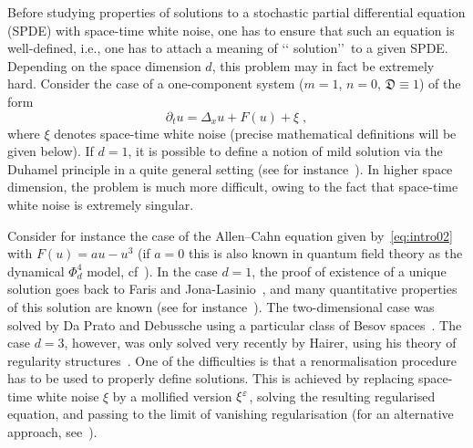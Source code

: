 \documentclass[reqno,11pt]{article}
\begin{document}
Before studying properties of solutions to a stochastic partial differential
equation (SPDE) with space-time white noise, one has to ensure that such an
equation is well-defined, i.e., one has to attach a meaning of \lq\lq
solution\rq\rq\ to a given SPDE. Depending on the space dimension $d$, this
problem may in fact be extremely hard. Consider the case of a one-component
system ($m=1$, $n=0$, $\mathfrak{D}\equiv 1$) of the form 
\begin{equation}
 \label{eq:intro02}
 \partial_t u = \Delta_x u + F(u) + \xi\;, 
\end{equation} 
where $\xi$ denotes space-time white noise (precise mathematical definitions
will be given below). If $d=1$, it is possible to define a notion of mild
solution via the Duhamel principle in a quite general setting (see for
instance~\cite{DaPrato_Jabczyk_92}). In higher space dimension, the problem
is much more difficult, owing to the fact that space-time white noise is
extremely singular. 

Consider for instance the case of the Allen--Cahn equation given
by~\eqref{eq:intro02} with $F(u)=au-u^3$ (if $a=0$ this is also known in
quantum field theory as the dynamical $\Phi_d^4$ model, cf~\cite{Feldman74}).
In the case $d=1$, the proof of existence of a unique solution goes back to
Faris and Jona-Lasinio~\cite{Faris_JonaLasinio82}, and many quantitative
properties of this solution are known (see for
instance~\cite{Cerrai_1996,BG12a,Barret_2015}). The two-dimensional case was
solved by Da Prato and Debussche using a particular class of Besov
spaces~\cite{DaPrato_Debussche_2003}. The case $d=3$, however, was only solved
very recently by Hairer, using his theory of regularity
structures~\cite{Hairer2014}. One of the difficulties is that a renormalisation
procedure has to be used to properly define solutions. This is achieved by
replacing space-time white noise $\xi$ by a mollified version $\xi^\varepsilon$,
solving the resulting regularised equation, and passing to the limit of
vanishing regularisation (for an alternative approach,
see~\cite{Kupiainen_2014}). 
\end{document}
